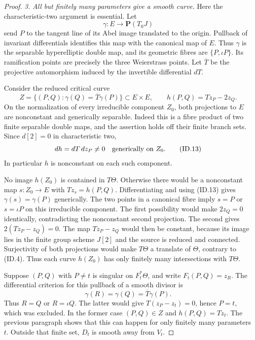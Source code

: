 \begin{proof}
\emph{3. All but finitely many parameters give a smooth curve.}
Here the characteristic-two argument is essential. Let
\[
                \gamma:E\longrightarrow\mathbf P(T_0J)
 \tag{ID.11}
\]
send $P$ to the tangent line of its Abel image translated
to the origin. Pullback of invariant differentials identifies
this map with the canonical map of $E$. Thus $\gamma$ is the
separable hyperelliptic double map, and its geometric fibres
are $\{P,\iota P\}$. Its ramification points are precisely
the three Weierstrass points. Let $\overline T$ be the
projective automorphism induced by the invertible differential
$dT$.

Consider the reduced critical curve
\[
 Z=\{(P,Q):\gamma(Q)=\overline T\gamma(P)\}
             \subset E\times E,
 \qquad h(P,Q)=Tz_P-2z_Q.
 \tag{ID.12}
\]
On the normalization of every irreducible component $Z_0$,
both projections to $E$ are nonconstant and generically
separable. Indeed this is a fibre product of two finite
separable double maps, and the assertion holds off their
finite branch sets. Since $d[2]=0$ in characteristic two,
\[
                         dh=dT\,dz_P\ne0
                         \quad\hbox{generically on }Z_0.
 \tag{ID.13}
\]
In particular $h$ is nonconstant on each such component.

No image $h(Z_0)$ is contained in $T\Theta$. Otherwise
there would be a nonconstant map $s:Z_0\to E$ with
$Tz_s=h(P,Q)$. Differentiating and using (ID.13) gives
$\gamma(s)=\gamma(P)$ generically. The two points in a
canonical fibre imply $s=P$ or $s=\iota P$ on this
irreducible component. The first possibility would make
$2z_Q=0$ identically, contradicting the nonconstant second
projection. The second gives
$2(Tz_P-z_Q)=0$. The map $Tz_P-z_Q$ would then be constant,
because its image lies in the finite group scheme $J[2]$
and the source is reduced and connected. Surjectivity of
both projections would make $T\Theta$ a translate of
$\Theta$, contrary to (ID.4). Thus each curve $h(Z_0)$
has only finitely many intersections with $T\Theta$.

Suppose $(P,Q)$ with $P\ne t$ is singular on $F_t^*\Theta$,
and write $F_t(P,Q)=z_R$. The differential criterion for
this pullback of a smooth divisor is
\[
                    \gamma(R)=\gamma(Q)=\overline T\gamma(P).
 \tag{ID.14}
\]
Thus $R=Q$ or $R=\iota Q$. The latter would give
$T(z_P-z_t)=0$, hence $P=t$, which was excluded. In the
former case $(P,Q)\in Z$ and $h(P,Q)=Tz_t$.
The previous paragraph shows that this can happen for only
finitely many parameters $t$. Outside that finite set,
$D_t$ is smooth away from $V_t$.


\end{proof}
